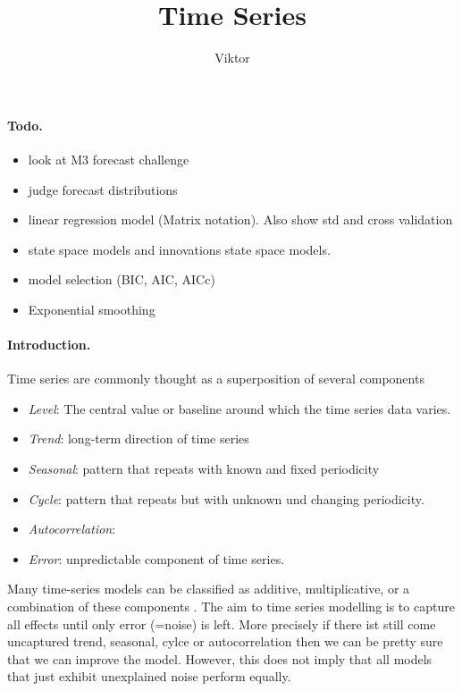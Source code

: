 \documentclass[12pt,a4paper]{article}
\begin{document}

\title{Time Series}
\author{Viktor}
\maketitle
\paragraph{Todo.}
\begin{itemize}
	\item look at M3 forecast challenge
	\item judge forecast distributions
	\item linear regression model (Matrix notation). Also show std and cross validation
	\item state space models and innovations state space models.
	\item model selection (BIC, AIC, AICc)
	\item Exponential smoothing
\end{itemize}

\paragraph{Introduction.}
Time series are commonly thought as a superposition of several components
\begin{itemize}
	\item \textit{Level}: The central value or baseline around which the time series data varies.
	\item \textit{Trend}: long-term direction of time series
	\item \textit{Seasonal}: pattern that repeats with known and fixed periodicity 
	\item \textit{Cycle}: pattern that repeats but with unknown und changing periodicity.
	\item \textit{Autocorrelation}:
	\item \textit{Error}: unpredictable component of time series.
\end{itemize}

Many time-series models can be classified as additive, multiplicative, or a combination of these components \cite{hyndman_forecasting_with_exponential_smoothing}. The aim to time series modelling is to capture all effects until only error (=noise) is left. More precisely if there ist still come uncaptured trend, seasonal, cylce or autocorrelation then we can be pretty sure that we can improve the model. However, this does not imply that all models that just exhibit unexplained noise perform equally.  
\end{document}
